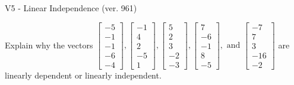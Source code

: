 \begin{exercise}
  \begin{exerciseTitle}V5 - Linear Independence (ver. 961)\end{exerciseTitle}
  \begin{exerciseStatement}
    Explain why the vectors \(\left[\begin{array}{r}
-5 \\
-1 \\
-1 \\
-6 \\
-4
\end{array}\right] , \left[\begin{array}{r}
-1 \\
4 \\
2 \\
-5 \\
1
\end{array}\right] , \left[\begin{array}{r}
5 \\
2 \\
3 \\
-2 \\
-3
\end{array}\right] , \left[\begin{array}{r}
7 \\
-6 \\
-1 \\
8 \\
-5
\end{array}\right] , \text{ and } \left[\begin{array}{r}
-7 \\
7 \\
3 \\
-16 \\
-2
\end{array}\right]\) are linearly dependent or linearly independent.	



\end{exerciseStatement}
\end{exercise}

